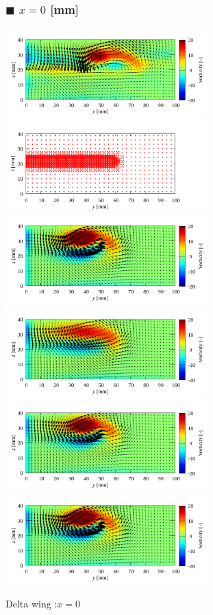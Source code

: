 \documentclass[twocolumn,a4j]{jsarticle}
\begin{document}
\begin{figure}[htbp]
	\subsubsection*{$\blacksquare$ $x=0$ [mm]}
	\centering
	{
		\includegraphics[keepaspectratio, width=78mm]{../images/Simulation/Compare/experiment_x=0.png}
		\includegraphics[keepaspectratio, width=78mm]{../images/Simulation/0_Mesh/x=0.png}
		\includegraphics[keepaspectratio, width=78mm]{../images/Simulation/1_Laminar/x=0.png}
		\includegraphics[keepaspectratio, width=78mm]{../images/Simulation/2_kEpsilon/x=0.png}
		\includegraphics[keepaspectratio, width=78mm]{../images/Simulation/3_kOmegaSST/x=0.png}
		\includegraphics[keepaspectratio, width=78mm]{../images/Simulation/4_Smagorinsky/x=0.png}
	}
	\caption{Delta wing :$x=0$}
\end{figure}
\end{document}
